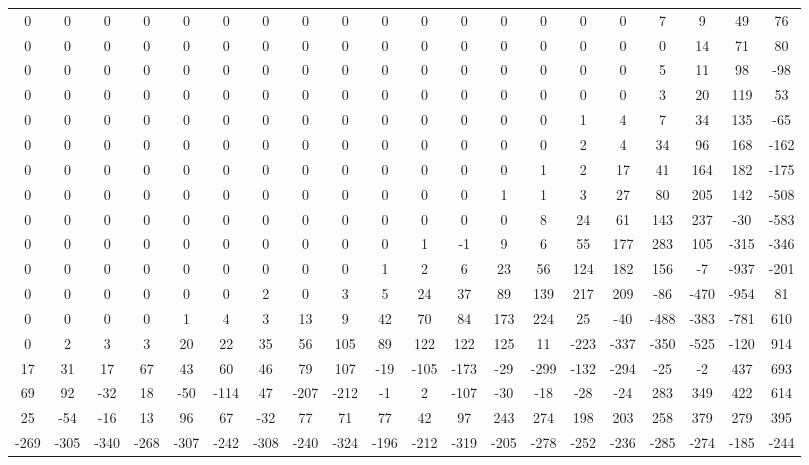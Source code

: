  \begin{tabular}{ | * {20}{c} | } 
0 & 0 & 0 & 0 & 0 & 0 & 0 & 0 & 0 & 0 & 0 & 0 & 0 & 0 & 0 & 0 & 7 & 9 & 49 & 76 \\ 
0 & 0 & 0 & 0 & 0 & 0 & 0 & 0 & 0 & 0 & 0 & 0 & 0 & 0 & 0 & 0 & 0 & 14 & 71 & 80 \\ 
0 & 0 & 0 & 0 & 0 & 0 & 0 & 0 & 0 & 0 & 0 & 0 & 0 & 0 & 0 & 0 & 5 & 11 & 98 & -98 \\ 
0 & 0 & 0 & 0 & 0 & 0 & 0 & 0 & 0 & 0 & 0 & 0 & 0 & 0 & 0 & 0 & 3 & 20 & 119 & 53 \\ 
0 & 0 & 0 & 0 & 0 & 0 & 0 & 0 & 0 & 0 & 0 & 0 & 0 & 0 & 1 & 4 & 7 & 34 & 135 & -65 \\ 
0 & 0 & 0 & 0 & 0 & 0 & 0 & 0 & 0 & 0 & 0 & 0 & 0 & 0 & 2 & 4 & 34 & 96 & 168 & -162 \\ 
0 & 0 & 0 & 0 & 0 & 0 & 0 & 0 & 0 & 0 & 0 & 0 & 0 & 1 & 2 & 17 & 41 & 164 & 182 & -175 \\ 
0 & 0 & 0 & 0 & 0 & 0 & 0 & 0 & 0 & 0 & 0 & 0 & 1 & 1 & 3 & 27 & 80 & 205 & 142 & -508 \\ 
0 & 0 & 0 & 0 & 0 & 0 & 0 & 0 & 0 & 0 & 0 & 0 & 0 & 8 & 24 & 61 & 143 & 237 & -30 & -583 \\ 
0 & 0 & 0 & 0 & 0 & 0 & 0 & 0 & 0 & 0 & 1 & -1 & 9 & 6 & 55 & 177 & 283 & 105 & -315 & -346 \\ 
0 & 0 & 0 & 0 & 0 & 0 & 0 & 0 & 0 & 1 & 2 & 6 & 23 & 56 & 124 & 182 & 156 & -7 & -937 & -201 \\ 
0 & 0 & 0 & 0 & 0 & 0 & 2 & 0 & 3 & 5 & 24 & 37 & 89 & 139 & 217 & 209 & -86 & -470 & -954 & 81 \\ 
0 & 0 & 0 & 0 & 1 & 4 & 3 & 13 & 9 & 42 & 70 & 84 & 173 & 224 & 25 & -40 & -488 & -383 & -781 & 610 \\ 
0 & 2 & 3 & 3 & 20 & 22 & 35 & 56 & 105 & 89 & 122 & 122 & 125 & 11 & -223 & -337 & -350 & -525 & -120 & 914 \\ 
17 & 31 & 17 & 67 & 43 & 60 & 46 & 79 & 107 & -19 & -105 & -173 & -29 & -299 & -132 & -294 & -25 & -2 & 437 & 693 \\ 
69 & 92 & -32 & 18 & -50 & -114 & 47 & -207 & -212 & -1 & 2 & -107 & -30 & -18 & -28 & -24 & 283 & 349 & 422 & 614 \\ 
25 & -54 & -16 & 13 & 96 & 67 & -32 & 77 & 71 & 77 & 42 & 97 & 243 & 274 & 198 & 203 & 258 & 379 & 279 & 395 \\ 
-269 & -305 & -340 & -268 & -307 & -242 & -308 & -240 & -324 & -196 & -212 & -319 & -205 & -278 & -252 & -236 & -285 & -274 & -185 & -244 \\ 
 \end{tabular} 
